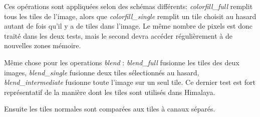 			Ces opérations sont appliquées selon des schémas différents: \emph{colorfill\_full} remplit tous les tiles de l'image, alors que \emph{colorfill\_single}
			remplit un tile choisit au hasard autant de fois qu'il y a de tiles dans l'image. Le même nombre de pixels est donc traité dans les deux tests,
			mais le second devra accéder régulièrement à de nouvelles zones mémoire.

			Même chose pour les operations \emph{blend} : \emph{blend\_full} fusionne les tiles des deux images, \emph{blend\_single} fusionne deux tiles
			sélectionnés au hasard, \emph{blend\_intermediate} fusionne toute l'image sur un seul tile. Ce dernier test est fort représentatif de la
			manière dont les tiles sont utilisés dans Himalaya.

			Ensuite les tiles normales sont comparées aux tiles à canaux séparés. 
			

